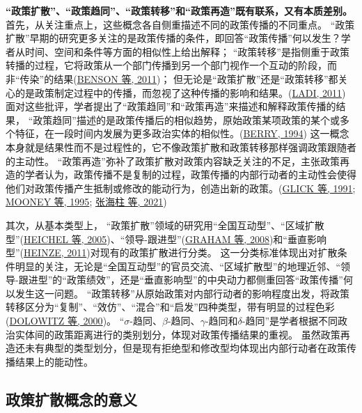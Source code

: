 \documentclass[
  12pt,
]{ctexart}
\begin{document}
\textbf{``政策扩散''、``政策趋同''、``政策转移''和``政策再造''既有联系，又有本质差别。}
首先，从关注重点上，这些概念各自侧重描述不同的政策传播的不同重点。
``政策扩散''早期的研究更多关注的是政策传播的条件，即回答``政策传播''何以发生？学者从时间、空间和条件等方面的相似性上给出解释；
``政策转移''是指侧重于政策转播的过程，它将政策从一个部门传播到另一个部门视作一个互动的阶段，而非``传染''的结果(\protect\hyperlink{ref-BensonJordan2011}{BENSON 等, 2011})；
但无论是``政策扩散''还是``政策转移''都关心的是政策制定过程中的传播，而忽视了这种传播的影响和结果。(\protect\hyperlink{ref-Ladi2011}{LADI, 2011})
面对这些批评，学者提出了``政策趋同''和``政策再造''来描述和解释政策传播的结果，
``政策趋同''描述的是政策传播后的相似趋势，原始政策某项政策的某个或多个特征，在一段时间内发展为更多政治实体的相似性。(\protect\hyperlink{ref-Berry1994}{BERRY, 1994})
这一概念本身就是结果性而不是过程性的，它不像政策扩散和政策转移那样强调政策跟随者的主动性。
``政策再造''弥补了政策扩散对政策内容缺乏关注的不足，主张政策再造的学者认为，政策传播不是复制的过程，政策传播的内部行动者的主动性会使得他们对政策传播产生抵制或修改的能动行为，创造出新的政策。(\protect\hyperlink{ref-GlickHays1991}{GLICK 等, 1991}; \protect\hyperlink{ref-MooneyLee1995}{MOONEY 等, 1995}; \protect\hyperlink{ref-ZhangHaiZhuLinHuaJing2021}{张海柱 等, 2021})

其次，从基本类型上，
``政策扩散''领域的研究用``全国互动型''、``区域扩散型''(\protect\hyperlink{ref-HeichelEtAl2005}{HEICHEL 等, 2005})、``领导-跟进型''(\protect\hyperlink{ref-GrahamEtAl2008}{GRAHAM 等, 2008})和``垂直影响型''(\protect\hyperlink{ref-Heinze2011}{HEINZE, 2011})对现有的政策扩散进行分类。
这一分类标准体现出对扩散条件明显的关注，无论是``全国互动型''的官员交流、``区域扩散型''的地理近邻、``领导-跟进型''的``政策绩效''，还是``垂直影响型''的中央动力都侧重回答``政策传播''何以发生这一问题。
``政策转移''从原始政策对内部行动者的影响程度出发，将政策转移区分为``复制''、``效仿''、``混合''和``启发''四种类型，带有明显的过程色彩(\protect\hyperlink{ref-DolowitzMarsh2000}{DOLOWITZ 等, 2000})。
``\(σ\)-趋同、\(β\)-趋同、\(γ\)-趋同和\(δ\)-趋同''是学者根据不同政治实体间的政策距离进行的类别划分，体现对政策传播结果的重视。
虽然政策再造还未有典型的类型划分，但是现有拒绝型和修改型均体现出内部行动者在政策传播结果上的能动性。

\hypertarget{ux653fux7b56ux6269ux6563ux6982ux5ff5ux7684ux610fux4e49}{%
\subsection{政策扩散概念的意义}\label{ux653fux7b56ux6269ux6563ux6982ux5ff5ux7684ux610fux4e49}}
\end{document}

